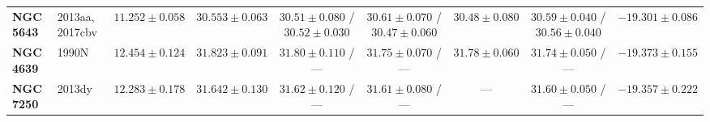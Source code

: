 \documentclass[11pt,letterpaper]{article}
\begin{document}
\begin{table}[!htbp]
{\begin{tabular}{llccccccc}
\textbf{NGC 5643} & 2013aa, 2017cbv & $11.252 \pm 0.058$ & $30.553 \pm 0.063$ & $30.51 \pm 0.080$ / $30.52 \pm 0.030$ & $30.61 \pm 0.070$ / $30.47 \pm 0.060$ & $30.48 \pm 0.080$ & $30.59 \pm 0.040$ / $30.56 \pm 0.040$ & $-19.301 \pm 0.086$ \\
\textbf{NGC 4639} & 1990N & $12.454 \pm 0.124$ & $31.823 \pm 0.091$ & $31.80 \pm 0.110$ / --- & $31.75 \pm 0.070$ / --- & $31.78 \pm 0.060$ & $31.74 \pm 0.050$ / --- & $-19.373 \pm 0.155$ \\
\textbf{NGC 7250} & 2013dy & $12.283 \pm 0.178$ & $31.642 \pm 0.130$ & $31.62 \pm 0.120$ / --- & $31.61 \pm 0.080$ / --- & --- & $31.60 \pm 0.050$ / --- & $-19.357 \pm 0.222$ \\
\bottomrule
\end{tabular}%
}
\end{table}
\end{document}
